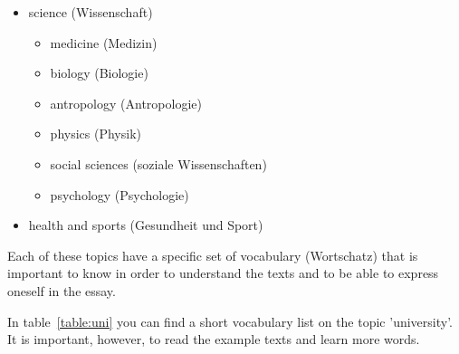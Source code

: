 \documentclass[12pt]{article}
\begin{document}
\begin{itemize}
    \item science (Wissenschaft)
        \begin{itemize}
            \item medicine (Medizin)
            \item biology (Biologie)
            \item antropology (Antropologie)
            \item physics (Physik)
            \item social sciences (soziale Wissenschaften)
            \item psychology (Psychologie)        
        \end{itemize}
    \item health and sports (Gesundheit und Sport)
\end{itemize}

Each of these topics have a specific set of vocabulary (Wortschatz) that is important to know in order to understand the texts
and to be able to express oneself in the essay.

In table~\ref{table:uni} you can find a short vocabulary list on the topic 'university'. 
It is important, however, to read the example texts and learn more words.
\end{document}
